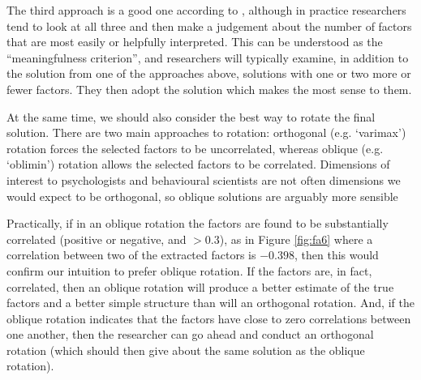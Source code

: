 The third approach is a good one according to \textcite{Fabrigar1999}, although in practice researchers tend to look at all three and then make a judgement about the number of factors that are most easily or helpfully interpreted. This can be understood as the ``meaningfulness criterion'', and researchers will typically examine, in addition to the solution from one of the approaches above, solutions with one or two more or fewer factors. They then adopt the solution which makes the most sense to them.

At the same time, we should also consider the best way to rotate the final solution. There are two main approaches to rotation: orthogonal (e.g. `varimax') rotation forces the selected factors to be uncorrelated, whereas oblique (e.g. `oblimin') rotation allows the selected factors to be correlated. Dimensions of interest to psychologists and behavioural scientists are not often dimensions we would expect to be orthogonal, so oblique solutions are arguably more sensible 

Practically, if in an oblique rotation the factors are found to be substantially correlated (positive or negative, and $>0.3$), as in Figure \ref{fig:fa6} where a correlation between two of the extracted factors is $-0.398$, then this would confirm our intuition to prefer oblique rotation. If the factors are, in fact, correlated, then an oblique rotation will produce a better estimate of the true factors and a better simple structure than will an orthogonal rotation. And, if the oblique rotation indicates that the factors have close to zero correlations between one another, then the researcher can go ahead and conduct an orthogonal rotation (which should then give about the same solution as the oblique rotation).

